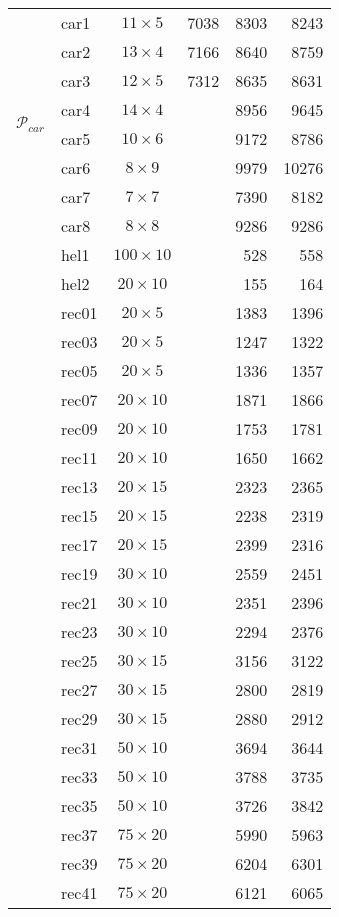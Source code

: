 \begin{longtable}{|ll|c|rrr|}
\multirow{8}{*}{$\mathcal{P}_{car}$}
& car1&$11\times5$&7038&8303&8243\\
& car2&$13\times4$&7166&8640&8759\\
& car3&$12\times5$&7312&8635&8631\\
& car4&$14\times4$&&8956&9645\\
& car5&$10\times6$&&9172&8786\\
& car6&$8\times9$&&9979&10276\\
& car7&$7\times7$&&7390&8182\\
& car8&$8\times8$&&9286&9286\\
\hline\pagebreak[2]
\multirow{2}{*}{$\mathcal{P}_{hel}$}
& hel1&$100\times10$&&528&558\\
& hel2&$20\times10$&&155&164\\
\hline\pagebreak[2]
\multirow{21}{*}{$\mathcal{P}_{rec}$}
& rec01&$20\times5$&&1383&1396\\
& rec03&$20\times5$&&1247&1322\\
& rec05&$20\times5$&&1336&1357\\
& rec07&$20\times10$&&1871&1866\\
& rec09&$20\times10$&&1753&1781\\
& rec11&$20\times10$&&1650&1662\\
& rec13&$20\times15$&&2323&2365\\
& rec15&$20\times15$&&2238&2319\\
& rec17&$20\times15$&&2399&2316\\
& rec19&$30\times10$&&2559&2451\\
& rec21&$30\times10$&&2351&2396\\
& rec23&$30\times10$&&2294&2376\\
& rec25&$30\times15$&&3156&3122\\
& rec27&$30\times15$&&2800&2819\\
& rec29&$30\times15$&&2880&2912\\
& rec31&$50\times10$&&3694&3644\\
& rec33&$50\times10$&&3788&3735\\
& rec35&$50\times10$&&3726&3842\\
& rec37&$75\times20$&&5990&5963\\
& rec39&$75\times20$&&6204&6301\\
& rec41&$75\times20$&&6121&6065\\
\end{longtable}
\renewcommand{\arraystretch}{1}